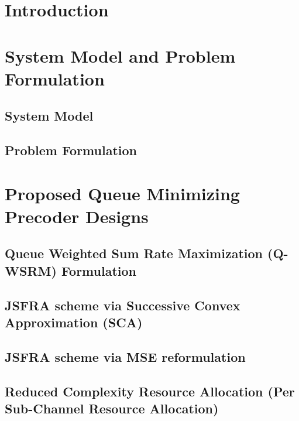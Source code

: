 \documentclass[11pt,draftcls,onecolumn,letterpaper]{./../Styles/IEEEtran}
\begin{document}

\begin{abstract}
%
\end{abstract}

\section{Introduction} \label{sec-1}


\section{System Model and Problem Formulation} \label{sec-2-3.2}
\subsection{System Model} \label{sec-2}

\subsection{Problem Formulation} \label{sec-3.2}


\section{Proposed Queue Minimizing Precoder Designs} \label{sec-3}


\subsection{Queue Weighted Sum Rate Maximization (\acs{Q-WSRM}) Formulation} \label{sec-3.1}


\subsection{\acs{JSFRA} scheme via Successive Convex Approximation (\acs{SCA})} \label{sec-3.2.1}



\subsection{\ac{JSFRA} scheme via MSE reformulation} \label{sec-3.3}


\subsection{Reduced Complexity Resource Allocation (Per Sub-Channel Resource Allocation)} \label{sec-3.4}

\end{document}
